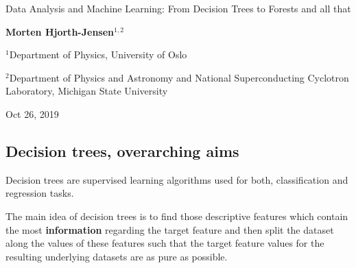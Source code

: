 \documentclass[%
oneside,                 %
final,                   %
10pt]{article}
\begin{document}

\newcommand{\exercisesection}[1]{\subsection*{#1}}






\thispagestyle{empty}

\begin{center}
{\LARGE\bf
\begin{spacing}{1.25}
Data Analysis and Machine Learning: From Decision Trees to Forests and all that
\end{spacing}
}
\end{center}


\begin{center}
{\bf Morten Hjorth-Jensen${}^{1, 2}$} \\ [0mm]
\end{center}

\begin{center}
\centerline{{\small ${}^1$Department of Physics, University of Oslo}}
\centerline{{\small ${}^2$Department of Physics and Astronomy and National Superconducting Cyclotron Laboratory, Michigan State University}}
\end{center}
    

\begin{center}
Oct 26, 2019
\end{center}

\vspace{1cm}


\subsection*{Decision trees, overarching aims}


Decision trees are supervised learning algorithms used for both,
classification and regression tasks.


The main idea of decision trees
is to find those descriptive features which contain the most
\textbf{information} regarding the target feature and then split the dataset
along the values of these features such that the target feature values
for the resulting underlying datasets are as pure as possible.
\end{document}
